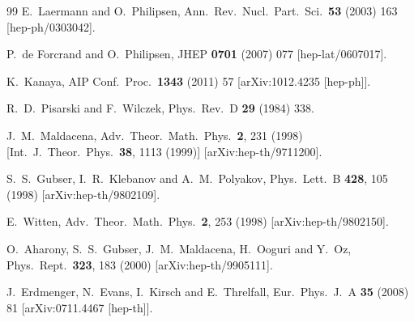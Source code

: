\documentclass[aps,prd,showpacs,preprintnumbers,twocolumn]{revtex4}
\begin{document}
\begin{thebibliography}{99}
  E.~Laermann and O.~Philipsen,
  Ann.\ Rev.\ Nucl.\ Part.\ Sci.\  {\bf 53} (2003) 163
  [hep-ph/0303042].

  P.~de Forcrand and O.~Philipsen,
  JHEP {\bf 0701} (2007) 077
  [hep-lat/0607017].

  K.~Kanaya,
  AIP Conf.\ Proc.\  {\bf 1343} (2011) 57
  [arXiv:1012.4235 [hep-ph]].

  R.~D.~Pisarski and F.~Wilczek,
  Phys.\ Rev.\ D {\bf 29} (1984) 338.

  J.~M.~Maldacena,
  Adv.\ Theor.\ Math.\ Phys.\  {\bf 2}, 231 (1998)
  [Int.\ J.\ Theor.\ Phys.\  {\bf 38}, 1113 (1999)]  [arXiv:hep-th/9711200].

  S.~S.~Gubser, I.~R.~Klebanov and A.~M.~Polyakov,
  Phys.\ Lett.\  B {\bf 428}, 105 (1998)
  [arXiv:hep-th/9802109].

  E.~Witten,
  Adv.\ Theor.\ Math.\ Phys.\  {\bf 2}, 253 (1998)
  [arXiv:hep-th/9802150].



  O.~Aharony, S.~S.~Gubser, J.~M.~Maldacena, H.~Ooguri and Y.~Oz,
  Phys.\ Rept.\  {\bf 323}, 183 (2000)
  [arXiv:hep-th/9905111].


  J.~Erdmenger, N.~Evans, I.~Kirsch and E.~Threlfall,
  Eur.\ Phys.\ J.\ A {\bf 35} (2008) 81
  [arXiv:0711.4467 [hep-th]].


\end{thebibliography}
\end{document}
